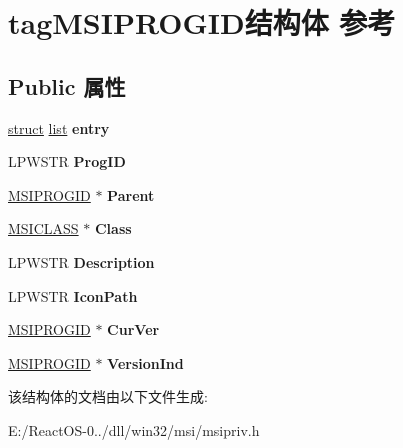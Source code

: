 \hypertarget{structtag_m_s_i_p_r_o_g_i_d}{}\section{tag\+M\+S\+I\+P\+R\+O\+G\+I\+D结构体 参考}
\label{structtag_m_s_i_p_r_o_g_i_d}
\subsection*{Public 属性}
\begin{DoxyCompactItemize}
\item 
\mbox{\label{structtag_m_s_i_p_r_o_g_i_d_a3a1d2497e0896d027609e38d9e46c450}} 
\hyperlink{interfacestruct}{struct} \hyperlink{classlist}{list} {\bfseries entry}
\item 
\mbox{\label{structtag_m_s_i_p_r_o_g_i_d_a7981037d2f6ec01a3721dc504aa9597f}} 
L\+P\+W\+S\+TR {\bfseries Prog\+ID}
\item 
\mbox{\label{structtag_m_s_i_p_r_o_g_i_d_a536c5b3f3c0df008ccc5a2a46b2325fd}} 
\hyperlink{structtag_m_s_i_p_r_o_g_i_d}{M\+S\+I\+P\+R\+O\+G\+ID} $\ast$ {\bfseries Parent}
\item 
\mbox{\label{structtag_m_s_i_p_r_o_g_i_d_a32bb7ea6d3f642ad76080c9e18459794}} 
\hyperlink{structtag_m_s_i_c_l_a_s_s}{M\+S\+I\+C\+L\+A\+SS} $\ast$ {\bfseries Class}
\item 
\mbox{\label{structtag_m_s_i_p_r_o_g_i_d_ac776bde456bfec3c932c4153647fb47a}} 
L\+P\+W\+S\+TR {\bfseries Description}
\item 
\mbox{\label{structtag_m_s_i_p_r_o_g_i_d_ab87c491569f3fc36c6392fdf1b692ead}} 
L\+P\+W\+S\+TR {\bfseries Icon\+Path}
\item 
\mbox{\label{structtag_m_s_i_p_r_o_g_i_d_a1cb739ac955b51078f648d28c3a84ea2}} 
\hyperlink{structtag_m_s_i_p_r_o_g_i_d}{M\+S\+I\+P\+R\+O\+G\+ID} $\ast$ {\bfseries Cur\+Ver}
\item 
\mbox{\label{structtag_m_s_i_p_r_o_g_i_d_ab06305bc64752411044e7ccea1a43cd9}} 
\hyperlink{structtag_m_s_i_p_r_o_g_i_d}{M\+S\+I\+P\+R\+O\+G\+ID} $\ast$ {\bfseries Version\+Ind}
\end{DoxyCompactItemize}


该结构体的文档由以下文件生成\+:\begin{DoxyCompactItemize}
\item 
E\+:/\+React\+O\+S-\/0../dll/win32/msi/msipriv.\+h\end{DoxyCompactItemize}
